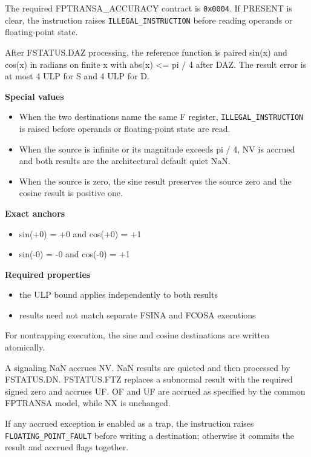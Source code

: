 The required FPTRANSA\_ACCURACY contract is \texttt{0x0004}. If PRESENT is clear, the instruction raises \texttt{ILLEGAL\_INSTRUCTION} before reading operands or floating-point state.

After FSTATUS.DAZ processing, the reference function is paired sin(x) and cos(x) in radians on finite x with abs(x) \textless{}= pi / 4 after DAZ. The result error is at most 4 ULP for S and 4 ULP for D.

\textbf{Special values}\par
\begin{itemize}
\item When the two destinations name the same F register, \texttt{ILLEGAL\_INSTRUCTION} is raised before operands or floating-point state are read.
\item When the source is infinite or its magnitude exceeds pi / 4, NV is accrued and both results are the architectural default quiet NaN.
\item When the source is zero, the sine result preserves the source zero and the cosine result is positive one.
\end{itemize}

\textbf{Exact anchors}\par
\begin{itemize}
\item sin(+0) = +0 and cos(+0) = +1
\item sin(-0) = -0 and cos(-0) = +1
\end{itemize}

\textbf{Required properties}\par
\begin{itemize}
\item the ULP bound applies independently to both results
\item results need not match separate FSINA and FCOSA executions
\end{itemize}

For nontrapping execution, the sine and cosine destinations are written atomically.

A signaling NaN accrues NV. NaN results are quieted and then processed by FSTATUS.DN. FSTATUS.FTZ replaces a subnormal result with the required signed zero and accrues UF. OF and UF are accrued as specified by the common FPTRANSA model, while NX is unchanged.

If any accrued exception is enabled as a trap, the instruction raises \texttt{FLOATING\_POINT\_FAULT} before writing a destination; otherwise it commits the result and accrued flags together.
